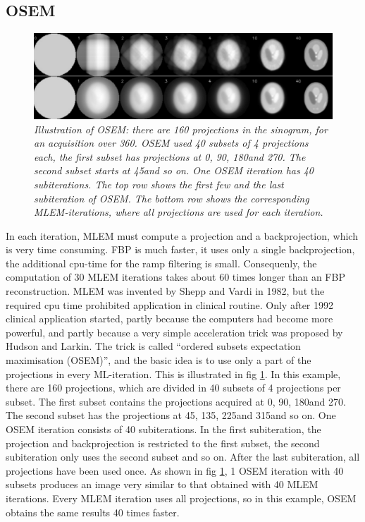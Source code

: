 \documentclass[11pt,oneside]{book}
\begin{document}
\subsection{OSEM} \label{sec:osem}
\begin{figure}[tb]
\centering
\includegraphics[width=\textwidth]{figs/fig_osem.pdf}
\caption{\label{fig:osem} \emph{Illustration of OSEM: there are 160
    projections in the sinogram, for an acquisition over
    360\textdegree. OSEM used 40 subsets of 4 projections each, the first
    subset has projections at 0\textdegree, 90\textdegree, 180\textdegree and
    270\textdegree. The second subset starts at 45\textdegree and so on. One
    OSEM iteration has 40 subiterations. The top row shows the first
    few and the last subiteration of OSEM. The bottom row shows the
    corresponding MLEM-iterations, where all projections are used for
    each iteration.}}
\end{figure}
In each iteration, MLEM must compute a projection and a
backprojection, which is very time consuming. FBP is much faster, it
uses only a single backprojection, the additional cpu-time for the
ramp filtering is small. Consequenly, the computation of 30 MLEM
iterations takes about 60 times longer than an FBP
reconstruction. MLEM was invented by Shepp and Vardi in 1982, but the
required cpu time prohibited application in clinical routine. Only
after 1992 clinical application started, partly because the computers
had become more powerful, and partly because a very simple
acceleration trick was proposed by Hudson and Larkin. The trick is
called ``ordered subsets expectation maximisation (OSEM)'', and the
basic idea is to use only a part of the projections in every
ML-iteration. This is illustrated in fig \ref{fig:osem}. In this
example, there are 160 projections, which are divided in 40 subsets of
4 projections per subset. The first subset contains the projections
acquired at 0\textdegree, 90\textdegree, 180\textdegree and 270\textdegree. The
second subset has the projections at 45\textdegree, 135\textdegree,
225\textdegree and 315\textdegree and so on. One OSEM iteration consists of
40 subiterations. In the first subiteration, the projection and
backprojection is restricted to the first subset, the second
subiteration only uses the second subset and so on. After the last
subiteration, all projections have been used once. As shown in fig
\ref{fig:osem}, 1 OSEM iteration with 40 subsets produces an image
very similar to that obtained with 40 MLEM iterations. Every MLEM
iteration uses all projections, so in this example, OSEM obtains the
same results 40 times faster.
\end{document}

